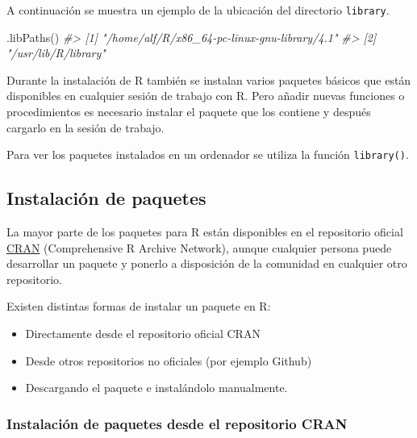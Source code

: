 \documentclass[
]{book}
\newenvironment{Shaded}{\begin{snugshade}}{\end{snugshade}}
\newcommand{\CommentTok}[1]{\textcolor[rgb]{0.56,0.35,0.01}{\textit{#1}}}
\newcommand{\FunctionTok}[1]{\textcolor[rgb]{0.00,0.00,0.00}{#1}}
\newcommand{\NormalTok}[1]{#1}
\providecommand{\tightlist}{%
  \setlength{\itemsep}{0pt}\setlength{\parskip}{0pt}}
\theoremstyle{definition}
\theoremstyle{definition}
\theoremstyle{definition}
\theoremstyle{definition}
\theoremstyle{remark}
\begin{document}
A continuación se muestra un ejemplo de la ubicación del directorio \texttt{library}.

\begin{Shaded}
\begin{Highlighting}[]
\FunctionTok{.libPaths}\NormalTok{()}
\CommentTok{\#\textgreater{} [1] "/home/alf/R/x86\_64{-}pc{-}linux{-}gnu{-}library/4.1"}
\CommentTok{\#\textgreater{} [2] "/usr/lib/R/library"}
\end{Highlighting}
\end{Shaded}

Durante la instalación de R también se instalan varios paquetes básicos que están disponibles en cualquier sesión de trabajo con R. Pero añadir nuevas funciones o procedimientos es necesario instalar el paquete que los contiene y después cargarlo en la sesión de trabajo.

Para ver los paquetes instalados en un ordenador se utiliza la función \texttt{library()}.

\hypertarget{instalaciuxf3n-de-paquetes}{%
\subsection{Instalación de paquetes}\label{instalaciuxf3n-de-paquetes}}

La mayor parte de los paquetes para R están disponibles en el repositorio oficial \href{Comprehensive\%20R\%20Archive\%20Network}{CRAN} (Comprehensive R Archive Network), aunque cualquier persona puede desarrollar un paquete y ponerlo a disposición de la comunidad en cualquier otro repositorio.

Existen distintas formas de instalar un paquete en R:

\begin{itemize}
\tightlist
\item
  Directamente desde el repositorio oficial CRAN
\item
  Desde otros repositorios no oficiales (por ejemplo Github)
\item
  Descargando el paquete e instalándolo manualmente.
\end{itemize}

\hypertarget{instalaciuxf3n-de-paquetes-desde-el-repositorio-cran}{%
\subsubsection{Instalación de paquetes desde el repositorio CRAN}\label{instalaciuxf3n-de-paquetes-desde-el-repositorio-cran}}
\end{document}
